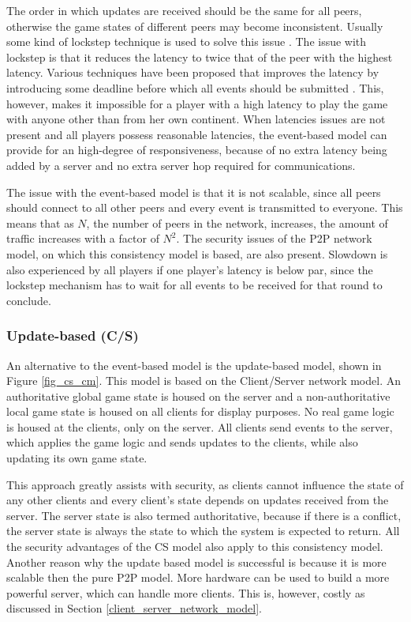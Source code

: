 \documentclass[10pt,a4paper,journal,cspaper,compsoc]{IEEEtran}
\begin{document}
The order in which updates are received should be the same for all peers, otherwise the game states of different peers may become inconsistent.
Usually some kind of lockstep technique is used to solve this issue \cite{pessimistic_lock_step}. The issue with lockstep is that it reduces the
latency to twice that of the peer with the highest latency. Various techniques have been proposed that improves the latency by introducing some
deadline before which all events should be submitted \cite{cheat_proof_event_ordering}. This, however, makes it impossible for a player with a high
latency to play the game with anyone other than from her own continent. When latencies issues are not present and all players possess reasonable
latencies, the event-based model can provide for an high-degree of responsiveness, because of no extra latency being added by a server and no extra
server hop required for communications.

The issue with the event-based model is that it is not scalable, since all peers should connect to all other peers and every event is transmitted to
everyone. This means that as $N$, the number of peers in the network, increases, the amount of traffic increases with a factor of $N^2$. The security
issues of the P2P network model, on which this consistency model is based, are also present. Slowdown is also experienced by all players if one
player's latency is below par, since the lockstep mechanism has to wait for all events to be received for that round to conclude.

\subsubsection{Update-based (C/S)}

An alternative to the event-based model is the update-based model, shown in Figure \ref{fig_cs_cm}. This model is based on the Client/Server network
model. An authoritative global game state is housed on the server and a non-authoritative local game state is housed on all clients for display
purposes. No real game logic is housed at the clients, only on the server. All clients send events to the server, which applies the game logic and
sends updates to the clients, while also updating its own game state.

This approach greatly assists with security, as clients cannot influence the state of any other clients and every client's state depends on updates
received from the server. The server state is also termed authoritative, because if there is a conflict, the server state is always the state to
which the system is expected to return. All the security advantages of the \ac{CS} model also apply to this consistency model. Another reason why the
update based model is successful is because it is more scalable then the pure P2P model. More hardware can be used to build a more powerful server,
which can handle more clients. This is, however, costly as discussed in Section \ref{client_server_network_model}.
\end{document}
